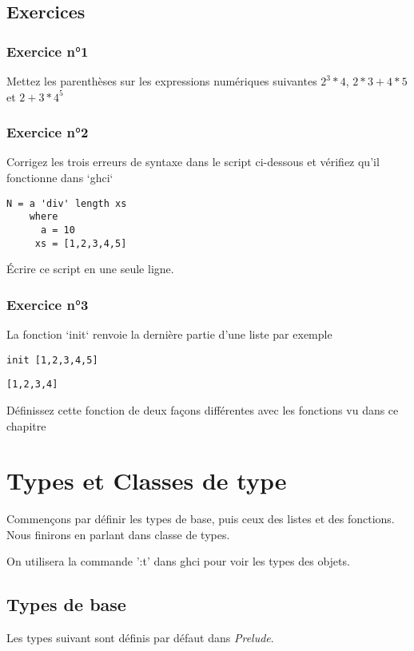 \documentclass[11pt]{article}
\begin{document}
\subsection{Exercices}
\label{sec:org85dcc66}

\subsubsection{Exercice n°1}
\label{sec:orge289546}
Mettez les parenthèses sur les expressions numériques suivantes
\(2^3*4\), \(2*3+4*5\)  et \(2+3*4^5\)

\subsubsection{Exercice n°2}
\label{sec:org0b6b81e}
Corrigez les trois erreurs de syntaxe dans le script ci-dessous et vérifiez qu'il fonctionne dans `ghci`
\begin{verbatim}
N = a 'div' length xs
    where 
      a = 10
     xs = [1,2,3,4,5]
\end{verbatim}

Écrire ce script en une seule ligne.


\subsubsection{Exercice n°3}
\label{sec:orgbdda6ef}
La fonction `init` renvoie la dernière partie d'une liste par exemple
\begin{verbatim}
init [1,2,3,4,5]
\end{verbatim}
\begin{verbatim}
[1,2,3,4]
\end{verbatim}


Définissez cette fonction de deux façons différentes avec les fonctions vu dans ce chapitre

\section{Types et Classes de type}
\label{sec:orge873c4f}
Commençons par définir les types de base, puis ceux des listes et des fonctions.  Nous finirons en parlant dans classe de types.  

On utilisera la commande ':t' dans ghci pour voir les types des objets.

\subsection{Types de base}
\label{sec:orgfca61b7}
Les types suivant  sont définis par défaut dans \emph{Prelude}.
\end{document}
